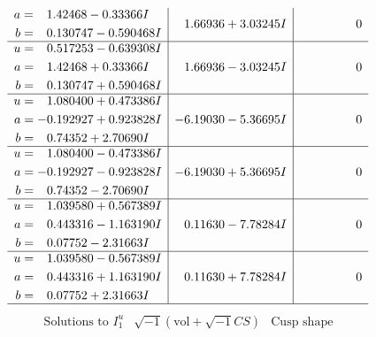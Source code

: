 \documentclass[1p]{elsarticle_modified}
\theoremstyle{definition}
\newcommand{\I}{\sqrt{-1}}
\begin{document}
$$\begin{array}{c|c|c}
\begin{aligned}
a &= \phantom{-}1.42468 - 0.33366 I \\
b &= \phantom{-}0.130747 - 0.590468 I\end{aligned}
 & \phantom{-}1.66936 + 3.03245 I & \phantom{-0.000000 } 0 \\ \hline\begin{aligned}
u &= \phantom{-}0.517253 - 0.639308 I \\
a &= \phantom{-}1.42468 + 0.33366 I \\
b &= \phantom{-}0.130747 + 0.590468 I\end{aligned}
 & \phantom{-}1.66936 - 3.03245 I & \phantom{-0.000000 } 0 \\ \hline\begin{aligned}
u &= \phantom{-}1.080400 + 0.473386 I \\
a &= -0.192927 + 0.923828 I \\
b &= \phantom{-}0.74352 + 2.70690 I\end{aligned}
 & -6.19030 - 5.36695 I & \phantom{-0.000000 } 0 \\ \hline\begin{aligned}
u &= \phantom{-}1.080400 - 0.473386 I \\
a &= -0.192927 - 0.923828 I \\
b &= \phantom{-}0.74352 - 2.70690 I\end{aligned}
 & -6.19030 + 5.36695 I & \phantom{-0.000000 } 0 \\ \hline\begin{aligned}
u &= \phantom{-}1.039580 + 0.567389 I \\
a &= \phantom{-}0.443316 - 1.163190 I \\
b &= \phantom{-}0.07752 - 2.31663 I\end{aligned}
 & \phantom{-}0.11630 - 7.78284 I & \phantom{-0.000000 } 0 \\ \hline\begin{aligned}
u &= \phantom{-}1.039580 - 0.567389 I \\
a &= \phantom{-}0.443316 + 1.163190 I \\
b &= \phantom{-}0.07752 + 2.31663 I\end{aligned}
 & \phantom{-}0.11630 + 7.78284 I & \phantom{-0.000000 } 0\\
 \hline 
 \end{array}$$\newpage$$\begin{array}{c|c|c}  
\text{Solutions to }I^u_{1}& \I (\text{vol} + \sqrt{-1}CS) & \text{Cusp shape}\\
 \hline 
\begin{aligned}

\end{aligned}
\end{array}$$
\end{document}
